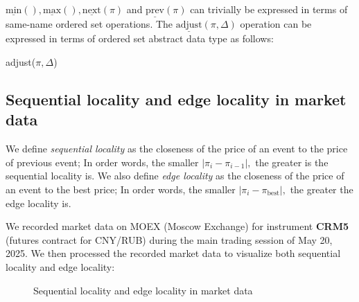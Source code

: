 \documentclass[a4paper,12pt]{article}
\begin{document}
$\underline{\mathrm{min}}(), \underline{\mathrm{max}}(), \underline{\mathrm{next}}(\pi)$ and $\underline{\mathrm{prev}}(\pi)$ can trivially be expressed in terms of same-name ordered set operations.
The $\underline{\mathrm{adjust}}(\pi, \Delta)$ operation can be expressed in terms of ordered set abstract data type as follows:

\begin{procedure}[H]
\DontPrintSemicolon
\caption{adjust($\pi, \Delta$)}
\end{procedure}

\subsection{Sequential locality and edge locality in market data}

We define \textit{sequential locality} as the closeness of the price of an event to the price of previous event;
In order words, the smaller $|\pi_i - \pi_{i-1}|,$ the greater is the sequential locality is.
We also define \textit{edge locality} as the closeness of the price of an event to the best price;
In order words, the smaller $|\pi_i - \pi_{\mathrm{best}}|,$ the greater the edge locality is.

We recorded market data on MOEX (Moscow Exchange) for instrument \textbf{CRM5} (futures contract for CNY/RUB) during the main trading session of May 20, 2025.
We then processed the recorded market data to visualize both sequential locality and edge locality:

\begin{figure}[H]
    \caption{Sequential locality and edge locality in market data}
    \centering
\end{figure}
\end{document}
